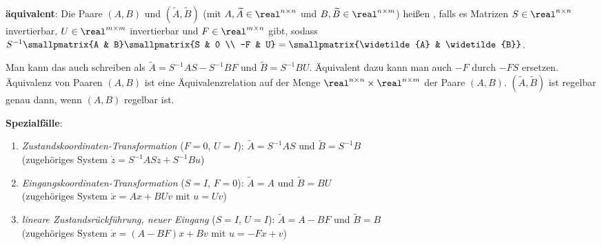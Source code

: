 \textbf{äquivalent}:
Die Paare $(A, B)$ und $(\widetilde{A}, \widetilde{B})$
(mit $A, \widetilde{A} \in \real^{n \times n}$ und
$B, \widetilde{B} \in \real^{n \times m}$) heißen ,
falls es Matrizen $S \in \real^{n \times n}$ invertierbar, $U \in \real^{m \times m}$
invertierbar und $F \in \real^{m \times n}$ gibt, sodass
$S^{-1} \smallpmatrix{A & B} \smallpmatrix{S & 0 \\ -F & U} =
\smallpmatrix{\widetilde{A} & \widetilde{B}}$.

Man kann das auch schreiben als
$\widetilde{A} = S^{-1} AS - S^{-1} BF$ und $\widetilde{B} = S^{-1} BU$.
Äquivalent dazu kann man auch $-F$ durch $-FS$ ersetzen.
Äquivalenz von Paaren $(A, B)$ ist eine Äquivalenzrelation
auf der Menge $\real^{n \times n} \times \real^{n \times m}$ der Paare $(A, B)$.
$(\widetilde{A}, \widetilde{B})$ ist regelbar genau dann, wenn $(A, B)$ regelbar ist.

\textbf{Spezialfälle}:
\begin{enumerate}
    \item
    \emph{Zustandskoordinaten-Transformation} ($F = 0$, $U = I$):
    $\widetilde{A} = S^{-1} AS$ und $\widetilde{B} = S^{-1} B$\\
    (zugehöriges System $\dot{z} = S^{-1} ASz + S^{-1} Bu$)

    \item
    \emph{Eingangskoordinaten-Transformation} ($S = I$, $F = 0$):
    $\widetilde{A} = A$ und $\widetilde{B} = BU$\\
    (zugehöriges System $\dot{x} = Ax + BUv$ mit $u = Uv$)

    \item
    \emph{lineare Zustandsrückführung, neuer Eingang} ($S = I$, $U = I$):
    $\widetilde{A} = A - BF$ und $\widetilde{B} = B$\\
    (zugehöriges System $\dot{x} = (A - BF)x + Bv$ mit $u = -Fx + v$)
\end{enumerate}

\linie
\pagebreak

